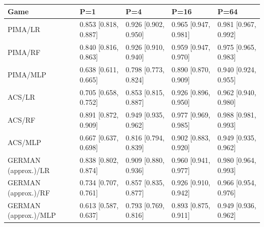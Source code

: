 \begingroup\footnotesize\setlength{\tabcolsep}{3pt}
\begin{tabular}{lllll}
\toprule
Game & P=1 & P=4 & P=16 & P=64 \\
\midrule
PIMA/LR & 0.853 [0.818, 0.887] & 0.926 [0.902, 0.950] & 0.965 [0.947, 0.981] & 0.981 [0.967, 0.992] \\
PIMA/RF & 0.840 [0.816, 0.863] & 0.926 [0.910, 0.940] & 0.959 [0.947, 0.970] & 0.975 [0.965, 0.983] \\
PIMA/MLP & 0.638 [0.611, 0.665] & 0.798 [0.773, 0.824] & 0.890 [0.870, 0.909] & 0.940 [0.924, 0.955] \\
ACS/LR & 0.705 [0.658, 0.752] & 0.853 [0.815, 0.887] & 0.926 [0.896, 0.950] & 0.962 [0.940, 0.980] \\
ACS/RF & 0.891 [0.872, 0.909] & 0.949 [0.935, 0.962] & 0.977 [0.969, 0.985] & 0.988 [0.981, 0.993] \\
ACS/MLP & 0.667 [0.637, 0.698] & 0.816 [0.794, 0.839] & 0.902 [0.883, 0.920] & 0.949 [0.935, 0.962] \\
GERMAN (approx.)/LR & 0.838 [0.802, 0.874] & 0.909 [0.880, 0.936] & 0.960 [0.941, 0.977] & 0.980 [0.964, 0.993] \\
GERMAN (approx.)/RF & 0.734 [0.707, 0.761] & 0.857 [0.835, 0.877] & 0.926 [0.910, 0.942] & 0.966 [0.954, 0.976] \\
GERMAN (approx.)/MLP & 0.613 [0.587, 0.637] & 0.793 [0.769, 0.816] & 0.893 [0.875, 0.911] & 0.949 [0.936, 0.962] \\
\bottomrule
\end{tabular}
\endgroup
